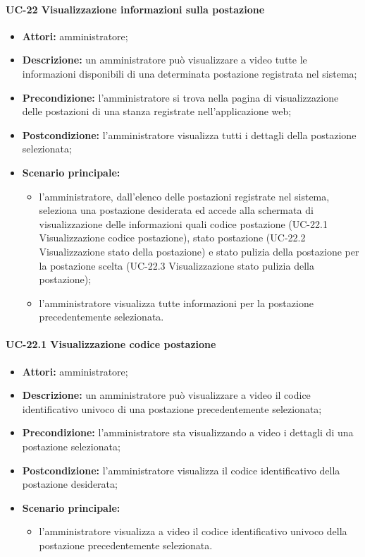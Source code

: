\paragraph{UC-22 Visualizzazione informazioni sulla postazione}
\begin{itemize}
    \item \textbf{Attori:} amministratore;
    \item \textbf{Descrizione:} un amministratore pu\`{o} visualizzare a video tutte le informazioni disponibili di una determinata postazione registrata nel sistema;
    \item \textbf{Precondizione:} l'amministratore si trova nella pagina di visualizzazione delle postazioni di una stanza registrate nell'applicazione web;
    \item \textbf{Postcondizione:} l'amministratore visualizza tutti i dettagli della postazione selezionata;
    \item \textbf{Scenario principale:}
    \begin{itemize}
        \item l'amministratore, dall'elenco delle postazioni registrate nel sistema, seleziona una postazione desiderata ed accede alla schermata di visualizzazione delle informazioni quali codice postazione (UC-22.1 Visualizzazione codice postazione), stato postazione (UC-22.2 Visualizzazione stato della postazione) e stato pulizia della postazione per la postazione scelta (UC-22.3 Visualizzazione stato pulizia della postazione);
        \item l'amministratore visualizza tutte informazioni per la postazione precedentemente selezionata.
    \end{itemize}
\end{itemize}

\paragraph{UC-22.1 Visualizzazione codice postazione}
\begin{itemize}
    \item \textbf{Attori:} amministratore;
    \item \textbf{Descrizione:} un amministratore pu\`{o} visualizzare a video il codice identificativo univoco di una postazione precedentemente selezionata;
    \item \textbf{Precondizione:} l'amministratore sta visualizzando a video i dettagli di una postazione selezionata;
    \item \textbf{Postcondizione:} l'amministratore visualizza il codice identificativo della postazione desiderata;
    \item \textbf{Scenario principale:}
    \begin{itemize}
        \item l'amministratore visualizza a video il codice identificativo univoco della postazione precedentemente selezionata.
    \end{itemize}
\end{itemize}

